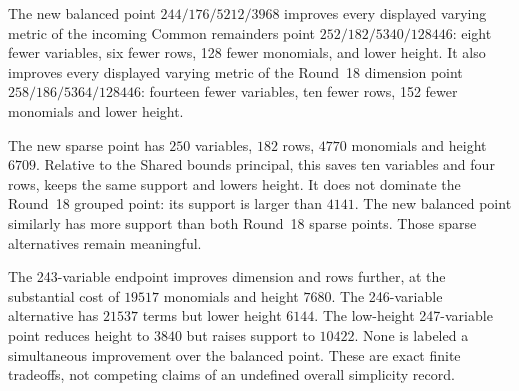 The new balanced point $244/176/5212/3968$ improves every displayed varying
metric of the incoming Common remainders point $252/182/5340/128446$:
eight fewer variables, six fewer rows, 128 fewer monomials, and lower
height. It also improves every displayed varying metric of the Round~18
dimension point $258/186/5364/128446$: fourteen fewer variables, ten fewer
rows, 152 fewer monomials and lower height.

The new sparse point has $250$ variables, $182$ rows, $4770$ monomials and
height $6709$. Relative to the Shared bounds principal, this saves ten
variables and four rows, keeps the same support and lowers height.
It does not dominate the Round~18 grouped point: its support is larger
than $4141$. The new balanced point similarly has more support than both
Round~18 sparse points. Those sparse alternatives remain meaningful.

The 243-variable endpoint improves dimension and rows further, at the
substantial cost of $19517$ monomials and height $7680$. The 246-variable
alternative has $21537$ terms but lower height $6144$. The low-height
247-variable point reduces height to $3840$ but raises support to $10422$.
None is labeled a simultaneous improvement over the balanced point.
These are exact finite tradeoffs, not competing claims of an undefined
overall simplicity record.
